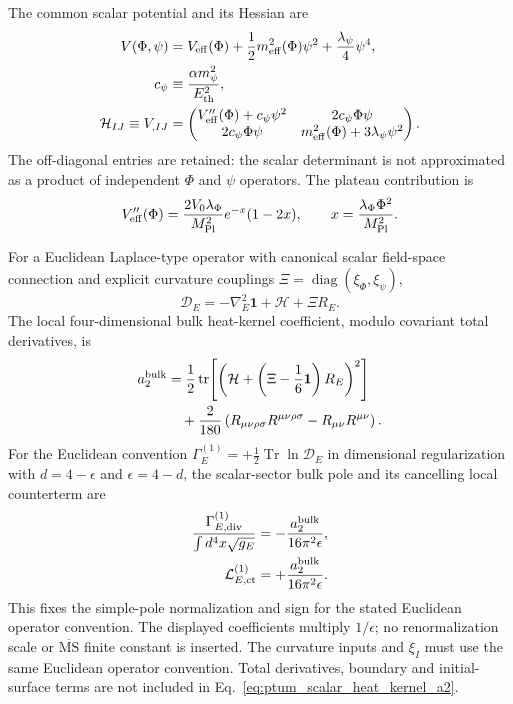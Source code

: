 \documentclass[epj]{svjour}
\begin{document}
The common scalar potential and its Hessian are
\begin{align}
V(\Phi,\psi)
&=V_{\rm eff}(\Phi)
+\frac12m_{\rm eff}^2(\Phi)\psi^2
+\frac{\lambda_\psi}{4}\psi^4,\\
c_\psi&\equiv\frac{\alpha m_\psi^2}{E_{\rm th}^2},\\
\mathcal H_{IJ}\equiv V_{,IJ}
&=
\begin{pmatrix}
V_{\rm eff}''(\Phi)+c_\psi\psi^2
&2c_\psi\Phi\psi\\
2c_\psi\Phi\psi
&m_{\rm eff}^2(\Phi)+3\lambda_\psi\psi^2
\end{pmatrix}.
\label{eq:ptum_scalar_hessian}
\end{align}
The off-diagonal entries are retained: the scalar determinant is not
approximated as a product of independent $\Phi$ and $\psi$ operators.
The plateau contribution is
\begin{equation}
V_{\rm eff}''(\Phi)=
\frac{2V_0\lambda_\Phi}{M_{\rm Pl}^2}
e^{-x}(1-2x),\qquad
x=\frac{\lambda_\Phi\Phi^2}{M_{\rm Pl}^2}.
\end{equation}

For a Euclidean Laplace-type operator with canonical scalar field-space
connection and explicit curvature couplings
$\Xi=\operatorname{diag}(\xi_\Phi,\xi_\psi)$,
\begin{equation}
\mathcal D_E=-\nabla_E^2\mathbf 1+\mathcal H+\Xi R_E.
\end{equation}
The local four-dimensional bulk heat-kernel coefficient, modulo
covariant total derivatives, is
\begin{equation}
\begin{aligned}
a_2^{\rm bulk}
&=\frac12\operatorname{tr}\!
\left[
\left(\mathcal H+
\left(\Xi-\frac16\mathbf 1\right)R_E\right)^2
\right]\\
&\quad+\frac{2}{180}
\left(
R_{\mu\nu\rho\sigma}R^{\mu\nu\rho\sigma}
-R_{\mu\nu}R^{\mu\nu}
\right).
\end{aligned}
\label{eq:ptum_scalar_heat_kernel_a2}
\end{equation}
For the Euclidean convention
$\Gamma_E^{(1)}=+\tfrac12\operatorname{Tr}\ln\mathcal D_E$ in
dimensional regularization with $d=4-\epsilon$ and $\epsilon=4-d$,
the scalar-sector bulk pole and its cancelling local counterterm are
\begin{align}
\frac{\Gamma_{E,\mathrm{div}}^{(1)}}{\int d^4x\sqrt{g_E}}
&=-\frac{a_2^{\rm bulk}}{16\pi^2\epsilon},\\
\mathcal L_{E,\mathrm{ct}}^{(1)}
&=+\frac{a_2^{\rm bulk}}{16\pi^2\epsilon}.
\label{eq:ptum_scalar_one_loop_pole}
\end{align}
This fixes the simple-pole normalization and sign for the stated
Euclidean operator convention. The displayed coefficients multiply
$1/\epsilon$; no renormalization scale or $\overline{\mathrm{MS}}$
finite constant is inserted. The curvature inputs and $\xi_I$ must use
the same Euclidean operator convention. Total derivatives, boundary
and initial-surface terms are not included in Eq.~\eqref{eq:ptum_scalar_heat_kernel_a2}.
\end{document}
